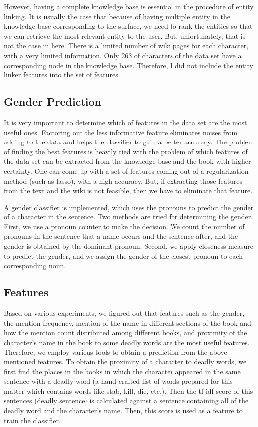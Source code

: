 \documentclass[letterpaper]{article}
\begin{document}
However, having a complete knowledge base is essential in the procedure of entity linking. It is usually the case that because of having multiple entity in the knowledge base corresponding to the surface, we need to rank the entities so that we can retrieve the most relevant entity to the user. But, unfortunately, that is not the case in here. There is a limited number of wiki pages for each character, with a very limited information. Only 263 of characters of the data set have a corresponding node in the knowledge base. Therefore, I did not include the entity linker features into the set of features.

\subsection{Gender Prediction}

It is very important to determine which of features in the data set are the most useful ones. Factoring out the less informative feature eliminates noises from adding to the data and helps the classifier to gain a better accuracy. The problem of finding the best features is heavily tied with the problem of which features of the data set can be extracted from the knowledge base and the book with higher certainty. One can come up with a set of features coming out of a regularization method (such as lasso), with a high accuracy. But, if extracting those features from the text and the wiki is not feasible, then we have to eliminate that feature.


A gender classifier is implemented, which uses the pronouns to predict the gender of a character in the sentence. Two methods are tried for determining the gender. First, we use a pronoun counter to make the decision. We count the number of pronouns in the sentence that a name occurs and the sentence after, and the gender is obtained by the dominant pronoun. Second, we apply closeness measure to predict the gender, and we assign the gender of the closest pronoun to each corresponding noun. 


\subsection{Features}

Based on various experiments, we figured out that features such as the gender, the mention frequency, mention of the name in different sections of the book and how the mention count distributed among different books, and proximity of the character's name in the book to some deadly words are the most useful features. Therefore, we employ various tools to obtain a prediction from the above-mentioned features. To obtain the proximity of a character to deadly words, we first find the places in the books in which the character appeared in the same sentence with a deadly word (a hand-crafted list of words prepared for this matter which contains words like stab, kill, die, etc.). Then the tf-idf score of this sentences (deadly sentence) is calculated against a sentence containing all of the deadly word and the character's name. Then, this score is used as a feature to train the classifier.
\end{document}
